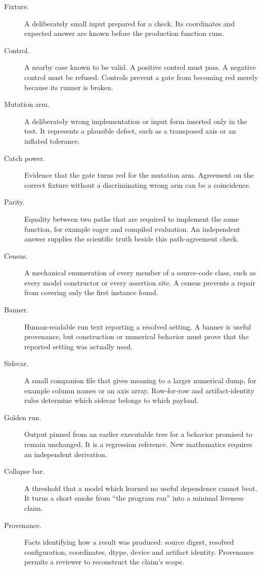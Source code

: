 \begin{description}
  \item[Fixture.] A deliberately small input prepared for a check.  Its
  coordinates and expected answer are known before the production function
  runs.

  \item[Control.] A nearby case known to be valid.  A positive control must
  pass.  A negative control must be refused.  Controls prevent a gate from
  becoming red merely because its runner is broken.

  \item[Mutation arm.] A deliberately wrong implementation or input form
  inserted only in the test.  It represents a plausible defect, such as a
  transposed axis or an inflated tolerance.

  \item[Catch power.] Evidence that the gate turns red for the mutation
  arm.  Agreement on the correct fixture without a discriminating wrong arm
  can be a coincidence.

  \item[Parity.] Equality between two paths that are required to implement
  the same function, for example eager and compiled evaluation.  An
  independent answer supplies the scientific truth beside this path-agreement
  check.

  \item[Census.] A mechanical enumeration of every member of a source-code
  class, such as every model constructor or every assertion site.  A census
  prevents a repair from covering only the first instance found.

  \item[Banner.] Human-readable run text reporting a resolved setting.  A
  banner is useful provenance, but construction or numerical behavior must
  prove that the reported setting was actually used.

  \item[Sidecar.] A small companion file that gives meaning to a larger
  numerical dump, for example column names or an axis array.  Row-for-row and
  artifact-identity rules determine which sidecar belongs to which payload.

  \item[Golden run.] Output pinned from an earlier executable tree for a
  behavior promised to remain unchanged.  It is a regression reference.  New
  mathematics requires an independent derivation.

  \item[Collapse bar.] A threshold that a model which learned no useful
  dependence cannot beat.  It turns a short smoke from ``the program ran''
  into a minimal liveness claim.

  \item[Provenance.] Facts identifying how a result was produced: source
  digest, resolved configuration, coordinates, dtype, device and artifact
  identity.  Provenance permits a reviewer to reconstruct the claim's scope.
\end{description}

